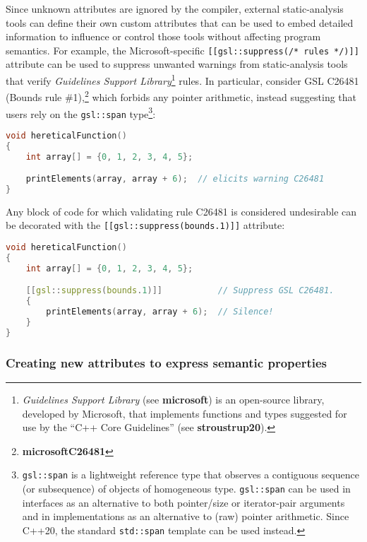 Since unknown attributes are ignored by the compiler, external
static-analysis tools can define their own custom attributes that can be
used to embed detailed information to influence or control those tools
without affecting program semantics. For example, the Microsoft-specific
\texttt{[[gsl::suppress(/*}~\texttt{rules}~\texttt{*/)]]} attribute can
be used to suppress unwanted warnings from static-analysis tools that
verify \emph{Guidelines Support Library}{\cprotect\footnote{\emph{Guidelines
Support Library} (see \textbf{microsoft}) is an open-source library, developed by Microsoft,
that implements functions and types suggested for use by the ``C++
  Core Guidelines'' (see \textbf{{stroustrup20}}).}}
rules. In particular, consider GSL C26481 (Bounds rule \#1),\footnote{\textbf{microsoftC26481}} which forbids any pointer arithmetic, instead
suggesting that users rely on the \texttt{gsl::span}
type{\cprotect\footnote{\texttt{gsl::span} is a lightweight reference
type that observes a contiguous sequence (or subsequence) of objects
of homogeneous type. \texttt{gsl::span} can be used in interfaces as
an alternative to both pointer/size or iterator-pair arguments and in
implementations as an alternative to (raw) pointer arithmetic. Since
  C++20, the standard \texttt{std::span} template can be used instead.}}:

\begin{lstlisting}[language=C++]
void hereticalFunction()
{
    int array[] = {0, 1, 2, 3, 4, 5};

    printElements(array, array + 6);  // elicits warning C26481
}
\end{lstlisting}
    
\noindent Any block of code for which validating rule C26481 is considered
undesirable can be decorated with the
\texttt{[[gsl::suppress(bounds.1)]]} attribute:

\begin{lstlisting}[language=C++]
void hereticalFunction()
{
    int array[] = {0, 1, 2, 3, 4, 5};

    [[gsl::suppress(bounds.1)]]           // Suppress GSL C26481.
    {
        printElements(array, array + 6);  // Silence!
    }
}
\end{lstlisting}
    

\subsubsection[Creating new attributes to express semantic properties]{Creating new attributes to express semantic properties}\label{creating-new-attributes-to-express-semantic-properties}

